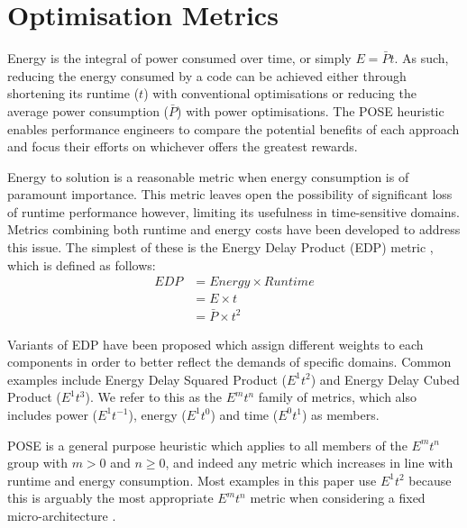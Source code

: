 \section{Optimisation Metrics}
\label{sec:metrics}

Energy is the integral of power consumed over time, or simply $E = \bar{P}t$.
As such, reducing the energy consumed by a code can be achieved either through shortening its runtime ($t$) with conventional optimisations or reducing the average power consumption ($\bar{P}$) with power optimisations.
The POSE heuristic enables performance engineers to compare the potential benefits of each approach and focus their efforts on whichever offers the greatest rewards.

Energy to solution is a reasonable metric when energy consumption is of paramount importance.
This metric leaves open the possibility of significant loss of runtime performance however, limiting its usefulness in time-sensitive domains.
Metrics combining both runtime and energy costs have been developed to address this issue. 
The simplest of these is the Energy Delay Product (EDP) metric \cite{gonzales:1995aa}, which is defined as follows:
\begin{align}
  EDP &= Energy \times Runtime \nonumber \\
      &= E \times t \nonumber \\
      &= \bar{P} \times t^2
  \label{eq:edp}
\end{align}

Variants of EDP have been proposed which assign different weights to each components in order to better reflect the demands of specific domains.
Common examples include Energy Delay Squared Product ($E^1t^{2}$) and Energy Delay Cubed Product ($E^1t^{3}$).
We refer to this as the $E^mt^n$ family of metrics, which also includes power ($E^1t^{-1}$), energy ($E^1t^0$) and time ($E^0t^1$) as members.

POSE is a general purpose heuristic which applies to all members of the $E^mt^n$ group with $m > 0$ and $n \geq 0$, and indeed any metric which increases in line with runtime and energy consumption.
Most examples in this paper use $E^1t^2$ because this is arguably the most appropriate $E^mt^n$ metric when considering a fixed micro-architecture \cite{brooks:2000aa}.
